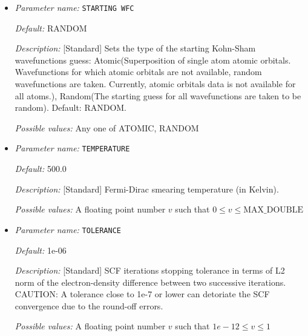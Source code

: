 \begin{itemize}


{\it Default:} 50


{\it Description:} [Standard] Maximum number of iterations to be allowed for SCF convergence


{\it Possible values:} An integer $n$ such that $1\leq n \leq 1000$
\item {\it Parameter name:} {\tt STARTING WFC}
\label{parameters:SCF parameters/STARTING WFC}
\label{parameters:SCF_20parameters/STARTING_20WFC}




{\it Default:} RANDOM


{\it Description:} [Standard] Sets the type of the starting Kohn-Sham wavefunctions guess: Atomic(Superposition of single atom atomic orbitals. Wavefunctions for which atomic orbitals are not available, random wavefunctions are taken. Currently, atomic orbitals data is not available for all atoms.), Random(The starting guess for all wavefunctions are taken to be random). Default: RANDOM.


{\it Possible values:} Any one of ATOMIC, RANDOM
\item {\it Parameter name:} {\tt TEMPERATURE}
\label{parameters:SCF parameters/TEMPERATURE}
\label{parameters:SCF_20parameters/TEMPERATURE}




{\it Default:} 500.0


{\it Description:} [Standard] Fermi-Dirac smearing temperature (in Kelvin).


{\it Possible values:} A floating point number $v$ such that $0 \leq v \leq \text{MAX\_DOUBLE}$
\item {\it Parameter name:} {\tt TOLERANCE}
\label{parameters:SCF parameters/TOLERANCE}
\label{parameters:SCF_20parameters/TOLERANCE}




{\it Default:} 1e-06


{\it Description:} [Standard] SCF iterations stopping tolerance in terms of L2 norm of the electron-density difference between two successive iterations. CAUTION: A tolerance close to 1e-7 or lower can detoriate the SCF convergence due to the round-off errors.


{\it Possible values:} A floating point number $v$ such that $1e-12 \leq v \leq 1$
\end{itemize}



